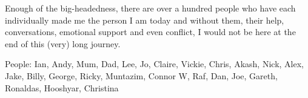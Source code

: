 Enough of the big-headedness, there are over a hundred people who have each individually made me the person I am today and without them, their help, conversations, emotional support and even conflict, I would not be here at the end of this (very) long journey.

People: Ian, Andy, Mum, Dad, Lee, Jo, Claire, Vickie, Chris, Akash, Nick, Alex, Jake, Billy, George, Ricky, Muntazim, Connor W, Raf, Dan, Joe, Gareth, Ronaldas, Hooshyar, Christina
